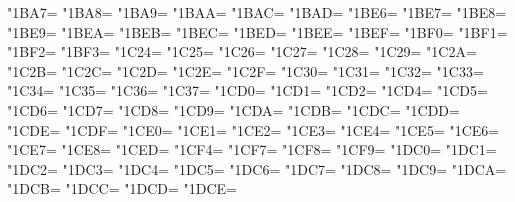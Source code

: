 \XeTeXcharclass"1BA7=\KclassCM
\XeTeXcharclass"1BA8=\KclassCM
\XeTeXcharclass"1BA9=\KclassCM
\XeTeXcharclass"1BAA=\KclassCM
\XeTeXcharclass"1BAC=\KclassCM
\XeTeXcharclass"1BAD=\KclassCM
\XeTeXcharclass"1BE6=\KclassCM
\XeTeXcharclass"1BE7=\KclassCM
\XeTeXcharclass"1BE8=\KclassCM
\XeTeXcharclass"1BE9=\KclassCM
\XeTeXcharclass"1BEA=\KclassCM
\XeTeXcharclass"1BEB=\KclassCM
\XeTeXcharclass"1BEC=\KclassCM
\XeTeXcharclass"1BED=\KclassCM
\XeTeXcharclass"1BEE=\KclassCM
\XeTeXcharclass"1BEF=\KclassCM
\XeTeXcharclass"1BF0=\KclassCM
\XeTeXcharclass"1BF1=\KclassCM
\XeTeXcharclass"1BF2=\KclassCM
\XeTeXcharclass"1BF3=\KclassCM
\XeTeXcharclass"1C24=\KclassCM
\XeTeXcharclass"1C25=\KclassCM
\XeTeXcharclass"1C26=\KclassCM
\XeTeXcharclass"1C27=\KclassCM
\XeTeXcharclass"1C28=\KclassCM
\XeTeXcharclass"1C29=\KclassCM
\XeTeXcharclass"1C2A=\KclassCM
\XeTeXcharclass"1C2B=\KclassCM
\XeTeXcharclass"1C2C=\KclassCM
\XeTeXcharclass"1C2D=\KclassCM
\XeTeXcharclass"1C2E=\KclassCM
\XeTeXcharclass"1C2F=\KclassCM
\XeTeXcharclass"1C30=\KclassCM
\XeTeXcharclass"1C31=\KclassCM
\XeTeXcharclass"1C32=\KclassCM
\XeTeXcharclass"1C33=\KclassCM
\XeTeXcharclass"1C34=\KclassCM
\XeTeXcharclass"1C35=\KclassCM
\XeTeXcharclass"1C36=\KclassCM
\XeTeXcharclass"1C37=\KclassCM
\XeTeXcharclass"1CD0=\KclassCM
\XeTeXcharclass"1CD1=\KclassCM
\XeTeXcharclass"1CD2=\KclassCM
\XeTeXcharclass"1CD4=\KclassCM
\XeTeXcharclass"1CD5=\KclassCM
\XeTeXcharclass"1CD6=\KclassCM
\XeTeXcharclass"1CD7=\KclassCM
\XeTeXcharclass"1CD8=\KclassCM
\XeTeXcharclass"1CD9=\KclassCM
\XeTeXcharclass"1CDA=\KclassCM
\XeTeXcharclass"1CDB=\KclassCM
\XeTeXcharclass"1CDC=\KclassCM
\XeTeXcharclass"1CDD=\KclassCM
\XeTeXcharclass"1CDE=\KclassCM
\XeTeXcharclass"1CDF=\KclassCM
\XeTeXcharclass"1CE0=\KclassCM
\XeTeXcharclass"1CE1=\KclassCM
\XeTeXcharclass"1CE2=\KclassCM
\XeTeXcharclass"1CE3=\KclassCM
\XeTeXcharclass"1CE4=\KclassCM
\XeTeXcharclass"1CE5=\KclassCM
\XeTeXcharclass"1CE6=\KclassCM
\XeTeXcharclass"1CE7=\KclassCM
\XeTeXcharclass"1CE8=\KclassCM
\XeTeXcharclass"1CED=\KclassCM
\XeTeXcharclass"1CF4=\KclassCM
\XeTeXcharclass"1CF7=\KclassCM
\XeTeXcharclass"1CF8=\KclassCM
\XeTeXcharclass"1CF9=\KclassCM
\XeTeXcharclass"1DC0=\KclassCM
\XeTeXcharclass"1DC1=\KclassCM
\XeTeXcharclass"1DC2=\KclassCM
\XeTeXcharclass"1DC3=\KclassCM
\XeTeXcharclass"1DC4=\KclassCM
\XeTeXcharclass"1DC5=\KclassCM
\XeTeXcharclass"1DC6=\KclassCM
\XeTeXcharclass"1DC7=\KclassCM
\XeTeXcharclass"1DC8=\KclassCM
\XeTeXcharclass"1DC9=\KclassCM
\XeTeXcharclass"1DCA=\KclassCM
\XeTeXcharclass"1DCB=\KclassCM
\XeTeXcharclass"1DCC=\KclassCM
\XeTeXcharclass"1DCD=\KclassCM
\XeTeXcharclass"1DCE=\KclassCM
